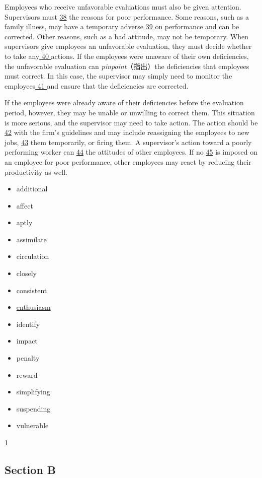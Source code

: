 \documentclass[UTF8,11pt]{ctexart}
\begin{document}
Employees who receive unfavorable evaluations must also be given attention. Supervisors must \uline{38} the reasons for poor performance. Some reasons, such as a family illness, may have a temporary adverse\uline{ 39 }on performance and can be corrected. Other reasons, such as a bad attitude, may not be temporary. When supervisors give employees an unfavorable evaluation, they must decide whether to take any\uline{ 40 }actions. If the employees were unaware of their own deficiencies, the unfavorable evaluation can\textit{ pinpoint}（指出）the deficiencies that employees must correct. In this case, the supervisor may simply need to monitor the employees\uline{ 41 }and ensure that the deficiencies are corrected.


If the employees were already aware of their deficiencies before the evaluation period, however, they may be unable or unwilling to correct them. This situation is more serious, and the supervisor may need to take action. The action should be \uline{42} with the firm’s guidelines and may include reassigning the employees to new jobs, \uline{43} them temporarily, or firing them. A supervisor’s action toward a poorly performing worker can \uline{44} the attitudes of other employees. If no \uline{45} is imposed on an employee for poor performance, other employees may react by reducing their productivity as well.


\begin{itemize}[leftmargin=2em,itemsep=.2em,topsep=.4em]\item[A.] additional
\item[B.] affect
\item[C.] aptly
\item[D.] assimilate
\item[E.] circulation
\item[F.] closely
\item[G.] consistent
\item[H.] \uline{enthusiasm}
\item[I.] identify
\item[J.] impact
\item[K.] penalty
\item[L.] reward
\item[M.] simplifying
\item[N.] suspending
\item[O.] vulnerable
\end{itemize}

1


\subsection*{\textbf{Section B}}
\end{document}
